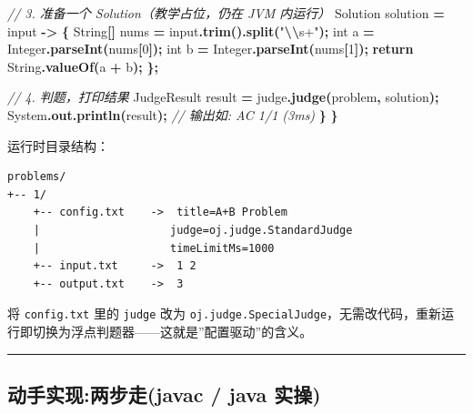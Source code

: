 \documentclass[
  11pt,
]{ctexart}
\newenvironment{Shaded}{\begin{snugshade}}{\end{snugshade}}
\newcommand{\BuiltInTok}[1]{#1}
\newcommand{\CommentTok}[1]{\textcolor[rgb]{0.56,0.35,0.01}{\textit{#1}}}
\newcommand{\ControlFlowTok}[1]{\textcolor[rgb]{0.13,0.29,0.53}{\textbf{#1}}}
\newcommand{\DataTypeTok}[1]{\textcolor[rgb]{0.13,0.29,0.53}{#1}}
\newcommand{\DecValTok}[1]{\textcolor[rgb]{0.00,0.00,0.81}{#1}}
\newcommand{\FunctionTok}[1]{\textcolor[rgb]{0.13,0.29,0.53}{\textbf{#1}}}
\newcommand{\NormalTok}[1]{#1}
\newcommand{\OperatorTok}[1]{\textcolor[rgb]{0.81,0.36,0.00}{\textbf{#1}}}
\newcommand{\SpecialCharTok}[1]{\textcolor[rgb]{0.81,0.36,0.00}{\textbf{#1}}}
\newcommand{\StringTok}[1]{\textcolor[rgb]{0.31,0.60,0.02}{#1}}
\begin{document}
\begin{Shaded}
\begin{Highlighting}[]
        \CommentTok{// 3. 准备一个 Solution（教学占位，仍在 JVM 内运行）}
\NormalTok{        Solution solution }\OperatorTok{=}\NormalTok{ input }\OperatorTok{{-}\textgreater{}} \OperatorTok{\{}
            \BuiltInTok{String}\OperatorTok{[]}\NormalTok{ nums }\OperatorTok{=}\NormalTok{ input}\OperatorTok{.}\FunctionTok{trim}\OperatorTok{().}\FunctionTok{split}\OperatorTok{(}\StringTok{"}\SpecialCharTok{\textbackslash{}\textbackslash{}}\StringTok{s+"}\OperatorTok{);}
            \DataTypeTok{int}\NormalTok{ a }\OperatorTok{=} \BuiltInTok{Integer}\OperatorTok{.}\FunctionTok{parseInt}\OperatorTok{(}\NormalTok{nums}\OperatorTok{[}\DecValTok{0}\OperatorTok{]);}
            \DataTypeTok{int}\NormalTok{ b }\OperatorTok{=} \BuiltInTok{Integer}\OperatorTok{.}\FunctionTok{parseInt}\OperatorTok{(}\NormalTok{nums}\OperatorTok{[}\DecValTok{1}\OperatorTok{]);}
            \ControlFlowTok{return} \BuiltInTok{String}\OperatorTok{.}\FunctionTok{valueOf}\OperatorTok{(}\NormalTok{a }\OperatorTok{+}\NormalTok{ b}\OperatorTok{);}
        \OperatorTok{\};}

        \CommentTok{// 4. 判题，打印结果}
\NormalTok{        JudgeResult result }\OperatorTok{=}\NormalTok{ judge}\OperatorTok{.}\FunctionTok{judge}\OperatorTok{(}\NormalTok{problem}\OperatorTok{,}\NormalTok{ solution}\OperatorTok{);}
        \BuiltInTok{System}\OperatorTok{.}\FunctionTok{out}\OperatorTok{.}\FunctionTok{println}\OperatorTok{(}\NormalTok{result}\OperatorTok{);}   \CommentTok{// 输出如: AC 1/1 (3ms)}
    \OperatorTok{\}}
\OperatorTok{\}}
\end{Highlighting}
\end{Shaded}

运行时目录结构：

\begin{verbatim}
problems/
+-- 1/
    +-- config.txt    ->  title=A+B Problem
    |                    judge=oj.judge.StandardJudge
    |                    timeLimitMs=1000
    +-- input.txt     ->  1 2
    +-- output.txt    ->  3
\end{verbatim}

将 \texttt{config.txt} 里的 \texttt{judge} 改为
\texttt{oj.judge.SpecialJudge}，无需改代码，重新运行即切换为浮点判题器------这就是''配置驱动''的含义。

\begin{center}\rule{0.5\linewidth}{0.5pt}\end{center}

\hypertarget{ux52a8ux624bux5b9eux73b0ux4e24ux6b65ux8d70javac-java-ux5b9eux64cd-2}{%
\subsection{动手实现:两步走(javac / java
实操)}\label{ux52a8ux624bux5b9eux73b0ux4e24ux6b65ux8d70javac-java-ux5b9eux64cd-2}}
\end{document}
